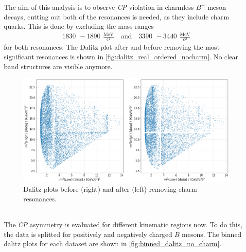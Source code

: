 The aim of this analysis is to observe \textit{CP} violation in charmless $B^{\pm}$ meson decays, cutting out both of the resonances is needed, as they include charm quarks. This is done by excluding the mass ranges  
\begin{align*}
  \qty{1830}{}\, - \qty{1890}{}\, \mathrm{\frac{MeV}{c^2}}  \quad \mathrm{and} \quad \qty{3390}{}\, - \qty{3440}{}\, \mathrm{\frac{MeV}{c^2}}
\end{align*}
for both resonances. The Dalitz plot after and before removing the most significant resonances is shown in \autoref{fig:dalitz_real_ordered_nocharm}. No clear band structures are visible anymore.
\begin{figure}
  \centering
  \includegraphics[width = .8\textwidth]{"content/pics/dalitz_real_ordered_no_charm.png"}
  \caption{Dalitz plots before (right) and after (left) removing charm resonances.}
  \label{fig:dalitz_real_ordered_nocharm}
\end{figure}
\\The \textit{CP} asymmetry is evaluated for different kinematic regions now. To do this, the data is splitted for positively and negatively charged $B$ mesons. The binned dalitz plots for each dataset are shown in \autoref{fig:binned_dalitz_no_charm}.

